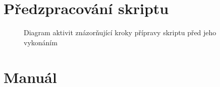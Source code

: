 \chapter{Předzpracování skriptu}
\label{Annex.ScriptPreprocessing}

\begin{figure}[H]
  \begin{center}
    \caption{Diagram aktivit znázorňující kroky přípravy skriptu před jeho vykonáním}
    \label{Figure.ScriptPreparationSteps}
  \end{center}
\end{figure}

\chapter{Manuál}
\label{Annex.manual}

